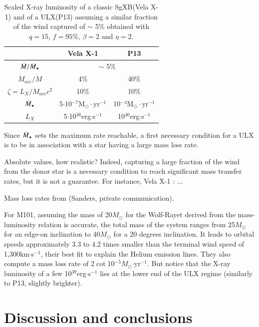 \documentclass[letter]{aa}
\makeatletter
\newcommand{\sgx}{SgXB\xspace}
\newcommand{\ulx}{ULX\xspace}
\newcommand{\mystar}{{\fontfamily{lmr}\selectfont$\star$}}
\newcommand*{\msun}{$M_{\odot}$\@\xspace}
\newcommand*{\mdotstar}{$\dot{M}_{\text{\mystar}}$\@\xspace}
\makeatother
\begin{document}
\begin{center}
\begin{table}[!h]
\caption{Scaled X-ray luminosity of a classic \sgx (Vela X-1) and of a \ulx (P13) assuming a similar fraction of the wind captured of $\sim$ 5\% obtained with $q=15$, $f=95\%$, $\beta=2$ and $\eta=2$.}
\label{tab:params}
\centering
\begin{tabularx}{0.83\columnwidth}{c|c|c}
   & Vela X-1 & P13 \\
  \hline
  $\dot{M}/\dot{M}_{\text{\mystar}}$ & \multicolumn{2}{c}{$\sim$ 5\%} \\
  \hline
  $\dot{M}_{acc}/\dot{M}$ & 4\%  & 40\% \\
  $\zeta=L_X/\dot{M}_{acc}c^2$ & 10\% & 10\% \\
  \mdotstar & 5$\cdot$10$^{-7}$M$_{\odot}\cdot$yr$^{-1}$ & 10$^{-4}$M$_{\odot}\cdot$yr$^{-1}$ \\
  $L_X$ & 5$\cdot$10$^{36}$erg$\cdot$s$^{-1}$ & 10$^{40}$erg$\cdot$s$^{-1}$ \\
\end{tabularx}
\end{table}
\end{center}

Since \mdotstar sets the maximum rate reachable, a first necessary condition for a \ulx is to be in association with a star having a large mass loss rate.

Absolute values, how realistic? Indeed, capturing a large fraction of the wind from the donor star is a necessary condition to reach significant mass transfer rates, but it is not a guarantee. For instance, Vela X-1 : ...

Mass loss rates from \cite{Vink2000,Vink2001} (Sanders, private communication).

For M101, assuming the mass of 20\msun for the Wolf-Rayet derived from the mass-luminosity relation is accurate, the total mass of the system ranges from 25\msun for an edge-on inclination to 40\msun for a 20 degrees inclination. It leads to orbital speeds approximately 3.3 to 4.2 times smaller than the terminal wind speed of 1,300km$\cdot$s$^{-1}$, their best fit to explain the Helium emission lines. They also compute a mass loss rate of 2$\cot$10$^{-5}$\msun$\cdot$yr$^{-1}$. But notice that the X-ray luminosity of a few 10$^{39}$erg$\cdot$s$^{-1}$ lies at the lower end of the ULX regime (similarly to P13, slightly brighter).

\section{Discussion and conclusions}
\label{sec:}
\end{document}
